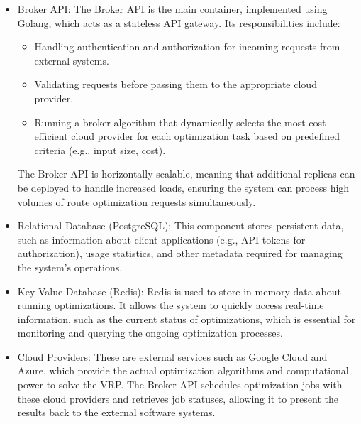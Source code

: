 \documentclass[english,notblind]{sbc20}
\begin{document}
\begin{itemize}
  \item Broker API: The Broker API is the main container, implemented using Golang, which acts as a stateless API gateway. Its responsibilities include:
        \begin{itemize}
          \item Handling authentication and authorization for incoming requests from external systems.
          \item Validating requests before passing them to the appropriate cloud provider.
          \item Running a broker algorithm that dynamically selects the most cost-efficient cloud provider for each optimization task based on predefined criteria (e.g., input size, cost).
        \end{itemize}

        The Broker API is horizontally scalable, meaning that additional replicas can be deployed to handle increased loads, ensuring the system can process high volumes of route optimization requests simultaneously.

  \item Relational Database (PostgreSQL): This component stores persistent data, such as information about client applications (e.g., API tokens for authorization), usage statistics, and other metadata required for managing the system's operations.

  \item Key-Value Database (Redis): Redis is used to store in-memory data about running optimizations. It allows the system to quickly access real-time information, such as the current status of optimizations, which is essential for monitoring and querying the ongoing optimization processes.

  \item Cloud Providers: These are external services such as Google Cloud and Azure, which provide the actual optimization algorithms and computational power to solve the VRP. The Broker API schedules optimization jobs with these cloud providers and retrieves job statuses, allowing it to present the results back to the external software systems.
\end{itemize}
\end{document}
